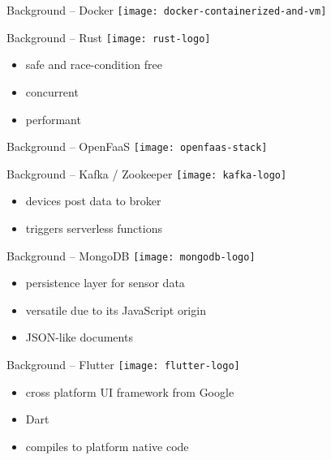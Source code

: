 \documentclass[aspectratio=169]{beamer}
\begin{document}
  \begin{frame}{Background -- Docker}
    \vfill
    \texttt{[image: docker-containerized-and-vm]}
  \end{frame}

  \begin{frame}{Background -- Rust}
    \texttt{[image: rust-logo]}

    \vspace*{1.5em}

    \begin{itemize}
      \item safe and race-condition free
      \item concurrent
      \item performant
    \end{itemize}
  \end{frame}

  \begin{frame}{Background -- OpenFaaS}
    \texttt{[image: openfaas-stack]}
  \end{frame}

  \begin{frame}{Background -- Kafka / Zookeeper}
    \texttt{[image: kafka-logo]}

    \vspace*{1.5em}

    \begin{itemize}
      \item devices post data to broker
      \item triggers serverless functions
    \end{itemize}
  \end{frame}

  \begin{frame}{Background -- MongoDB}
    \texttt{[image: mongodb-logo]}

    \vspace*{1.5em}

    \begin{itemize}
      \item persistence layer for sensor data
      \item versatile due to its JavaScript origin
      \item JSON-like documents
    \end{itemize}
  \end{frame}

  \begin{frame}{Background -- Flutter}
    \texttt{[image: flutter-logo]}

    \vspace*{2em}

    \begin{itemize}
      \item cross platform UI framework from Google
      \item Dart
      \item compiles to platform native code
    \end{itemize}
  \end{frame}
\end{document}

